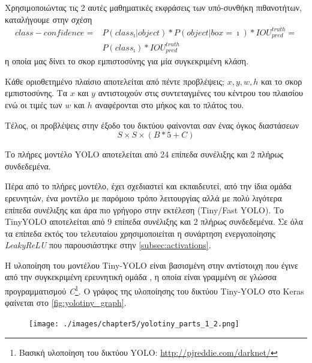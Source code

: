 Χρησιμοποιώντας τις 2 αυτές μαθηματικές εκφράσεις των υπό-συνθήκη πιθανοτήτων,
καταλήγουμε στην σχέση
\begin{equation*}
  \begin{aligned}
    class-confidence = {} & P(class_{\imath} | object) * P(object | box = \imath) * IOU_{pred}^{truth} = \\
                          & P(class_{\imath}) * IOU_{pred}^{truth}
  \end{aligned}
\end{equation*}
η οποία μας δίνει το σκορ εμπιστοσύνης για μία συγκεκριμένη κλάση.

Κάθε οριοθετημένο πλαίσιο αποτελείται από πέντε προβλέψεις; $x, y, w, h$ και
το σκορ εμπιστοσύνης. Τα $x$ και $y$ αντιστοιχούν στις συντεταγμένες του
κέντρου του πλαισίου ενώ οι τιμές των $w$ και $h$ αναφέρονται στο
μήκος και το πλάτος του.

Τέλος, οι προβλέψεις στην έξοδο του δικτύου φαίνονται σαν ένας όγκος
διαστάσεων
\begin{equation*}
  S \times S \times (B * 5 + C)
\end{equation*}

Το πλήρες μοντέλο YOLO αποτελείται από 24 επίπεδα συνέλιξης και 2 πλήρως
συνδεδεμένα.

Πέρα από το πλήρες μοντέλο, έχει σχεδιαστεί και εκπαιδευτεί, από την ίδια ομάδα ερευνητών, ένα μοντέλο
με παρόμοιο τρόπο λειτουργίας αλλά με πολύ λιγότερα επίπεδα συνέλιξης και άρα πιο
γρήγορο στην εκτέλεση (Tiny/Fast YOLO). Το TinyYOLO αποτελείται από 9 επίπεδα
συνέλιξης και 2 πλήρως συνδεδεμένα. Σε όλα τα επίπεδα εκτός του τελευταίου
χρησιμοποιείται η συνάρτηση ενεργοποίησης \emph{LeakyReLU} που παρουσιάστηκε στην \autoref{subsec:activations}.

Η υλοποίηση του μοντέλου Tiny-YOLO είναι βασισμένη στην αντίστοιχη
που έγινε από την συγκεκριμένη ερευνητική ομάδα
\cite{darknet13}, η οποία είναι γραμμένη σε γλώσσα προγραμματισμού \emph{C}\footnote{Βασική υλοποίηση του δικτύου YOLO: \url{http://pjreddie.com/darknet/}}.
Ο γράφος της υλοποίησης του δικτύου Tiny-YOLO στο Keras φαίνεται στο \autoref{fig:yolotiny_graph}.

\newpage

\begin{figure}[H]
  \centering
  \texttt{[image: ./images/chapter5/yolotiny\_parts\_1\_2.png]}
\end{figure}

